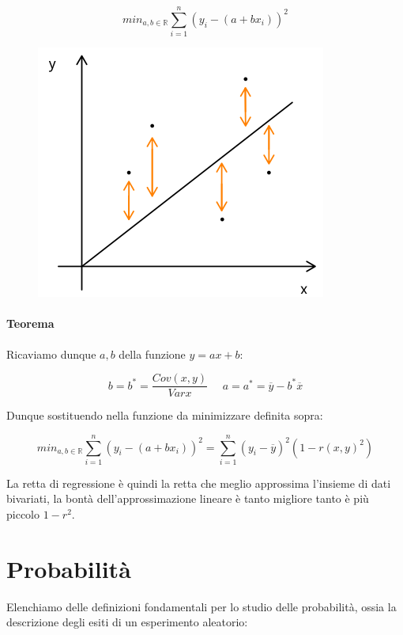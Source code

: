 \documentclass{article}
\begin{document}
\[ min_{a,b \in \mathbb{R}} \sum^{n}_{i=1} (y_{i} - (a+bx_{i}) )^{2} \]

\begin{figure}[htbp]
    \center
    \includegraphics[scale=0.425]{img/teorema-quadrati.png}
\end{figure}

\paragraph{Teorema} Ricaviamo dunque $a,b$ della funzione $y=ax+b$:

\[ b = b^{*} = \frac{Cov(x,y)}{Var{x}} \:\:\:\:\:\: a = a^{*} = \overline{y} - b^{*}\overline{x} \]

\vspace*{5px}

Dunque sostituendo nella funzione da minimizzare definita sopra:

\[ min_{a,b \in \mathbb{R}} \sum^{n}_{i=1} (y_{i} - (a+bx_{i}) )^{2} = \sum^{n}_{i=1} (y_{i} - \overline{y})^{2} (1-r(x,y)^{2}) \]

La retta di regressione è quindi la retta che meglio approssima l'insieme di dati bivariati, la bontà dell'approssimazione lineare è tanto migliore tanto è più piccolo $1-r^{2}$.

\newpage

\section{Probabilità}

Elenchiamo delle definizioni fondamentali per lo studio delle probabilità, ossia la descrizione degli esiti di un esperimento aleatorio:
\end{document}
